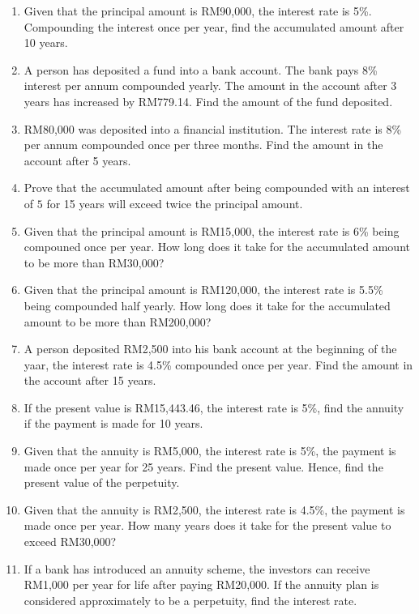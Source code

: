 \documentclass[12pt]{report}
\begin{document}
\setlength{\columnseprule}{1pt}
\setlength{\columnsep}{24pt}
\begin{multicols}{2}
  \begin{enumerate}
    \item Given that the principal amount is RM90,000, the interest rate is 5\%.
          Compounding the interest once per year, find the accumulated amount after 10
          years.
    \item A person has deposited a fund into a bank account. The bank pays 8\% interest
          per annum compounded yearly. The amount in the account after 3 years has
          increased by RM779.14. Find the amount of the fund deposited.

    \item RM80,000 was deposited into a financial institution. The interest rate is 8\%
          per annum compounded once per three months. Find the amount in the account
          after 5 years.
    \item Prove that the accumulated amount after being compounded with an interest of
          $5$ for 15 years will exceed twice the principal amount.
    \item Given that the principal amount is RM15,000, the interest rate is 6\% being
          compouned once per year. How long does it take for the accumulated amount to be
          more than RM30,000?
    \item Given that the principal amount is RM120,000, the interest rate is 5.5\% being
          compounded half yearly. How long does it take for the accumulated amount to be
          more than RM200,000?
    \item A person deposited RM2,500 into his bank account at the beginning of the yaar,
          the interest rate is 4.5\% compounded once per year. Find the amount in the
          account after 15 years.
    \item If the present value is RM15,443.46, the interest rate is 5\%, find the annuity
          if the payment is made for 10 years.
    \item Given that the annuity is RM5,000, the interest rate is 5\%, the payment is
          made once per year for 25 years. Find the present value. Hence, find the
          present value of the perpetuity.
    \item Given that the annuity is RM2,500, the interest rate is 4.5\%, the payment is
          made once per year. How many years does it take for the present value to exceed
          RM30,000?
    \item If a bank has introduced an annuity scheme, the investors can receive RM1,000
          per year for life after paying RM20,000. If the annuity plan is considered
          approximately to be a perpetuity, find the interest rate.
  \end{enumerate}
\end{multicols}
\end{document}
